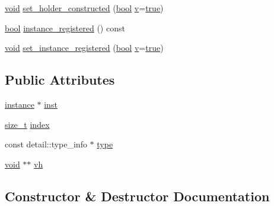 \begin{DoxyCompactItemize}
\item 
\mbox{\hyperlink{_s_d_l__opengles2__gl2ext_8h_ae5d8fa23ad07c48bb609509eae494c95}{void}} \mbox{\hyperlink{structvalue__and__holder_af0567bf8592782a504b541c1d84989b2}{set\+\_\+holder\+\_\+constructed}} (\mbox{\hyperlink{asdl_8h_af6a258d8f3ee5206d682d799316314b1}{bool}} \mbox{\hyperlink{_s_d_l__opengl_8h_a10a82eabcb59d2fcd74acee063775f90}{v}}=\mbox{\hyperlink{asdl_8h_af6a258d8f3ee5206d682d799316314b1a08f175a5505a10b9ed657defeb050e4b}{true}})
\item 
\mbox{\hyperlink{asdl_8h_af6a258d8f3ee5206d682d799316314b1}{bool}} \mbox{\hyperlink{structvalue__and__holder_ab48e48cb6e8746363dd03270599d3f7c}{instance\+\_\+registered}} () const
\item 
\mbox{\hyperlink{_s_d_l__opengles2__gl2ext_8h_ae5d8fa23ad07c48bb609509eae494c95}{void}} \mbox{\hyperlink{structvalue__and__holder_afbbc363d7cd9af2276ec62c5afe3d11e}{set\+\_\+instance\+\_\+registered}} (\mbox{\hyperlink{asdl_8h_af6a258d8f3ee5206d682d799316314b1}{bool}} \mbox{\hyperlink{_s_d_l__opengl_8h_a10a82eabcb59d2fcd74acee063775f90}{v}}=\mbox{\hyperlink{asdl_8h_af6a258d8f3ee5206d682d799316314b1a08f175a5505a10b9ed657defeb050e4b}{true}})
\end{DoxyCompactItemize}
\subsection*{Public Attributes}
\begin{DoxyCompactItemize}
\item 
\mbox{\hyperlink{structinstance}{instance}} $\ast$ \mbox{\hyperlink{structvalue__and__holder_ae92c90379fcf439b23fa77f1d7d84253}{inst}}
\item 
\mbox{\hyperlink{detail_2common_8h_a801d6a451a01953ef8cbae6feb6a3638}{size\+\_\+t}} \mbox{\hyperlink{structvalue__and__holder_a6e3af37221790786ae747e41e5d4f4c9}{index}}
\item 
const detail\+::type\+\_\+info $\ast$ \mbox{\hyperlink{structvalue__and__holder_a55c426843c6e3e164a600d55e4e70f67}{type}}
\item 
\mbox{\hyperlink{_s_d_l__opengles2__gl2ext_8h_ae5d8fa23ad07c48bb609509eae494c95}{void}} $\ast$$\ast$ \mbox{\hyperlink{structvalue__and__holder_a639783d7ffcce71865069b1537e1c1a8}{vh}}
\end{DoxyCompactItemize}


\subsection{Constructor \& Destructor Documentation}
\mbox{\label{structvalue__and__holder_ad0979a40cdfac38efa425ac5e9d98ef3}} 
